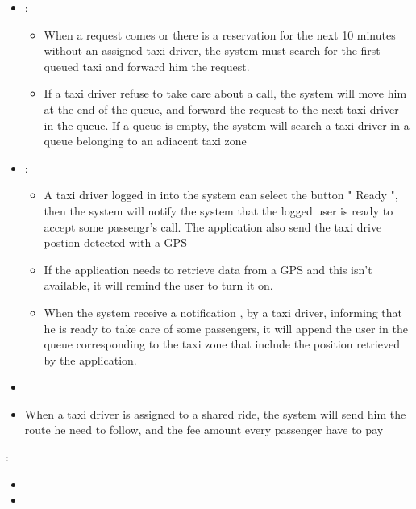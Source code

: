 \begin {itemize}
\item[G6]:
	\begin{itemize}
	\item When a request comes or there is a reservation for the next 10 minutes without an assigned taxi driver, the system must search for the first queued taxi and forward him the request.
	\item If a taxi driver refuse to take care about a call, the system will move him at the end of the queue, and forward the request to the next taxi driver in the queue. If a queue is empty, the system will search a taxi driver in a queue belonging to an adiacent taxi zone %
	\end{itemize}
\item [G7]:
	\begin{itemize}
	\item A taxi driver logged in into the system can select the button " Ready ", then the system will notify the system that the logged user is ready to accept some passengr's call. The application also send the taxi drive postion detected with a GPS
	\item If the application needs to retrieve data from a GPS and this isn't available, it will remind  the user to turn it on.
	\item When the system receive a notification , by a taxi driver, informing that he is ready to take care of some passengers, it will append the user in the queue corresponding to the taxi zone that include the position retrieved by the application.
	\end{itemize}
\item[G8]
	\item When a taxi driver is assigned to a shared ride, the system will send him the route he need to follow, and the fee amount every passenger have to pay
	\end{itemize}
\item[G9]:
	\begin{itemize}
	\item
	\item
	\end{itemize}
	
